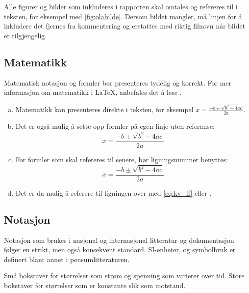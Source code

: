 \documentclass[11pt,a4paper,twocolumn]{article}
\begin{document}
Alle figurer og bilder som inkluderes i rapporten skal omtales og refereres til i teksten, for eksempel med \cref{fig:olabilde}. Dersom bildet mangler, må linjen for å inkludere det fjernes fra kommentering og erstattes med riktig filnavn når bildet er tilgjengelig.

\subsection{Matematikk}
Matematisk notasjon og formler bør presenteres tydelig og korrekt. For mer informasjon om matematikk i \LaTeX, anbefales det å lese \cite{Oetiker2007}.

\begin{enumerate}[a)]
    \item Matematikk kan presenteres direkte i teksten, for eksempel $x= \frac{-b \pm \sqrt{b^2 - 4ac}}{2a}$.
    \item Det er også mulig å sette opp formler på egen linje uten referanse:
    \[
        x= \frac{-b \pm \sqrt{b^2 - 4ac}}{2a}
    \]
    \item For formler som skal refereres til senere, bør ligningsnummer benyttes:
    \begin{equation}
        x= \frac{-b \pm \sqrt{b^2 - 4ac}}{2a}
        \label{eq:kv_lf}
    \end{equation}
    \item Det er da mulig å referere til ligningen over med \cref{eq:kv_lf} eller .
\end{enumerate}

\subsection{Notasjon}

Notasjon som brukes i nasjonal og internasjonal litteratur og dokumentasjon følger en strikt, men også konsekvent standard. SI-enheter, og symbolbruk er definert blant annet i pensumlitteraturen. 

Små bokstaver for størrelser som strøm og spenning som varierer over tid. Store bokstaver for størrelser som er konstante slik som motstand.
\end{document}
